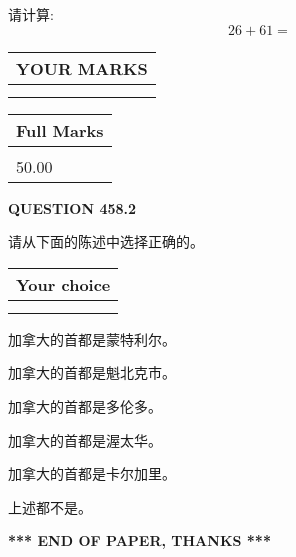 \documentclass{ctexart}
\begin{document}
  
 
请计算:
\begin{equation}
26 +  %
61 = \nonumber
\end{equation}
 

 

 
  
\vspace{0.2in}
  
\noindent\begin{tabular}{|l|}
\hline
 YOUR MARKS  \\
\hline
 \\ 
 \\ 
\hline
\end{tabular}
\hspace{0.05in} \begin{tabular}{|l|}
\hline
 Full Marks  \\
\hline
 \\ 
50.00 \\
\hline
\end{tabular}
{\textbf{\Large{QUESTION
458.2 
}}}
  
  
请从下面的陈述中选择正确的。
  
  
\noindent\hspace{3.0in} \begin{tabular}{|l|}
\hline
Your choice \\
\hline
 \\ 
 \\ 
\hline
\end{tabular}
  
  
 
 
加拿大的首都是蒙特利尔。
 
 
加拿大的首都是魁北克市。
 
 
加拿大的首都是多伦多。
 
 
加拿大的首都是渥太华。
 
 
加拿大的首都是卡尔加里。
 
 
 上述都不是。
 
 
   
   
 \vspace{0.2in}
 
   
   
   
   
\vspace{1.0in} 
{\textbf{\large{ *** END OF PAPER, THANKS *** }}} 
   
\end{document}
